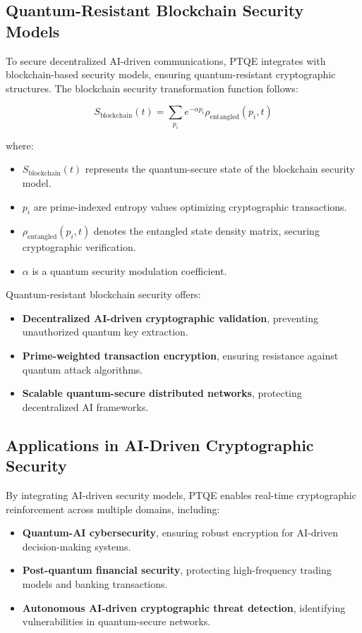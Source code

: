 \documentclass{article}
\theoremstyle{plain}
\begin{document}
\begin{itemize}
\subsection{Quantum-Resistant Blockchain Security Models}

To secure decentralized AI-driven communications, PTQE integrates with blockchain-based security models, ensuring quantum-resistant cryptographic structures. The blockchain security transformation function follows:

\begin{equation}
    S_{\text{blockchain}}(t) = \sum_{p_i} e^{- \alpha p_i} \rho_{\text{entangled}}(p_i, t)
\end{equation}

where:
\begin{itemize}
    \item \( S_{\text{blockchain}}(t) \) represents the quantum-secure state of the blockchain security model.
    \item \( p_i \) are prime-indexed entropy values optimizing cryptographic transactions.
    \item \( \rho_{\text{entangled}}(p_i, t) \) denotes the entangled state density matrix, securing cryptographic verification.
    \item \( \alpha \) is a quantum security modulation coefficient.
\end{itemize}

Quantum-resistant blockchain security offers:
\begin{itemize}
    \item \textbf{Decentralized AI-driven cryptographic validation}, preventing unauthorized quantum key extraction.
    \item \textbf{Prime-weighted transaction encryption}, ensuring resistance against quantum attack algorithms.
    \item \textbf{Scalable quantum-secure distributed networks}, protecting decentralized AI frameworks.
\end{itemize}

\subsection{Applications in AI-Driven Cryptographic Security}

By integrating AI-driven security models, PTQE enables real-time cryptographic reinforcement across multiple domains, including:

\begin{itemize}
    \item \textbf{Quantum-AI cybersecurity}, ensuring robust encryption for AI-driven decision-making systems.
    \item \textbf{Post-quantum financial security}, protecting high-frequency trading models and banking transactions.
    \item \textbf{Autonomous AI-driven cryptographic threat detection}, identifying vulnerabilities in quantum-secure networks.
\end{itemize}


\end{itemize}
\end{document}
